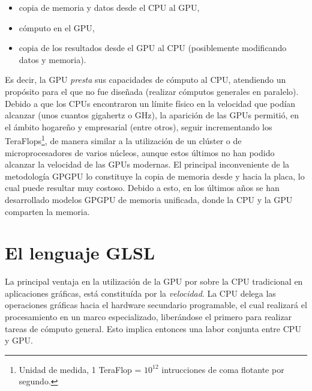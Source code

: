 \begin{itemize}
\item copia de memoria y datos desde el CPU al GPU,
\item cómputo en el GPU, 
\item copia de los resultados desde el GPU al CPU (posiblemente modificando datos y memoria).
\end{itemize}

\noindent Es decir, la GPU {\em presta} sus capacidades de cómputo al CPU, atendiendo un propósito para el que no fue diseñada (realizar cómputos generales en paralelo).
Debido a que los CPUs encontraron un límite físico en la velocidad que podían alcanzar (unos cuantos gigahertz o GHz), la aparición de las GPUs permitió, en el ámbito hogareño y empresarial (entre otros), seguir incrementando los TeraFlops\footnote{Unidad de medida, 1 TeraFlop = $10^{12}$ intrucciones de coma flotante por segundo.}, de manera similar a la utilización de un clúster o de microprocesadores de varios núcleos, aunque estos últimos no han podido alcanzar la velocidad de las GPUs modernas.
El principal inconveniente de la metodología GPGPU lo constituye la copia de memoria desde y hacia la placa, lo cual puede resultar muy costoso.
Debido a esto, en los últimos años se han desarrollado modelos GPGPU de memoria unificada, donde la CPU y la GPU comparten la memoria.



\section{El lenguaje GLSL}
La principal ventaja en la utilización de la GPU por sobre la CPU tradicional en aplicaciones gráficas, está constituída por la {\em velocidad}.
La CPU delega las operaciones gr\'aficas hacia el hardware secundario programable, el cual realizar\'a el procesamiento en un marco especializado, liberándose el primero para realizar tareas de cómputo general.
Esto implica entonces una labor conjunta entre CPU y GPU.



